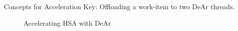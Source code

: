 \documentclass{beamer}
\begin{document}
\begin{CJK}{UTF8}{bkai}
    \begin{frame}{Concepts for Acceleration}
        Key: Offloading a work-item to two DeAr threads.\\
        \begin{figure}[!ht]
            \begin{center}
                \hfill
            \end{center}
            \caption{Accelerating HSA with DeAr}
            \label{fig:bb}
        \end{figure}
    \end{frame}


\end{CJK}
\end{document}
